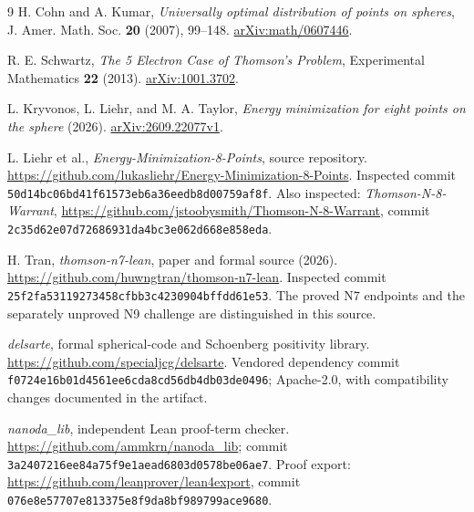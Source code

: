 \documentclass[11pt]{article}
\theoremstyle{remark}
\newcommand{\pathcode}[1]{\nolinkurl{#1}}
\begin{document}
\begin{thebibliography}{9}
H. Cohn and A. Kumar, \emph{Universally optimal distribution of points on
spheres}, J. Amer. Math. Soc. \textbf{20} (2007), 99--148.
\href{https://arxiv.org/abs/math/0607446}{arXiv:math/0607446}.

R. E. Schwartz, \emph{The 5 Electron Case of Thomson's Problem},
Experimental Mathematics \textbf{22} (2013).
\href{https://arxiv.org/abs/1001.3702}{arXiv:1001.3702}.

L. Kryvonos, L. Liehr, and M. A. Taylor,
\emph{Energy minimization for eight points on the sphere} (2026).
\href{https://arxiv.org/abs/2609.22077v1}{arXiv:2609.22077v1}.

L. Liehr et al., \emph{Energy-Minimization-8-Points}, source repository.
\url{https://github.com/lukasliehr/Energy-Minimization-8-Points}.
Inspected commit \pathcode{50d14bc06bd41f61573eb6a36eedb8d00759af8f}.
Also inspected: \emph{Thomson-N-8-Warrant},
\url{https://github.com/jstoobysmith/Thomson-N-8-Warrant}, commit
\pathcode{2c35d62e07d72686931da4bc3e062d668e858eda}.

H. Tran, \emph{thomson-n7-lean}, paper and formal source (2026).
\url{https://github.com/huwngtran/thomson-n7-lean}.
Inspected commit \pathcode{25f2fa53119273458cfbb3c4230904bffdd61e53}.
The proved N7 endpoints and the separately unproved N9 challenge are
distinguished in this source.

\emph{delsarte}, formal spherical-code and Schoenberg positivity library.
\url{https://github.com/specialjcg/delsarte}.
Vendored dependency commit \pathcode{f0724e16b01d4561ee6cda8cd56db4db03de0496};
Apache-2.0, with compatibility changes documented in the artifact.

\emph{nanoda\_lib}, independent Lean proof-term checker.
\url{https://github.com/ammkrn/nanoda_lib};
commit \pathcode{3a2407216ee84a75f9e1aead6803d0578be06ae7}.
Proof export: \url{https://github.com/leanprover/lean4export},
commit \pathcode{076e8e57707e813375e8f9da8bf989799ace9680}.
\end{thebibliography}
\end{document}
